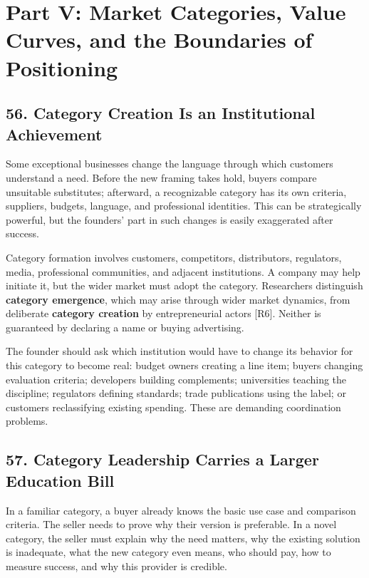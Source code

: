 \section*{Part V: Market Categories, Value Curves, and the Boundaries of Positioning}

\subsection*{56. Category Creation Is an Institutional Achievement}

Some exceptional businesses change the language through which customers understand a need. Before the new framing takes hold, buyers compare unsuitable substitutes; afterward, a recognizable category has its own criteria, suppliers, budgets, language, and professional identities. This can be strategically powerful, but the founders' part in such changes is easily exaggerated after success.

Category formation involves customers, competitors, distributors, regulators, media, professional communities, and adjacent institutions. A company may help initiate it, but the wider market must adopt the category. Researchers distinguish \textbf{category emergence}, which may arise through wider market dynamics, from deliberate \textbf{category creation} by entrepreneurial actors [R6]. Neither is guaranteed by declaring a name or buying advertising.

The founder should ask which institution would have to change its behavior for this category to become real: budget owners creating a line item; buyers changing evaluation criteria; developers building complements; universities teaching the discipline; regulators defining standards; trade publications using the label; or customers reclassifying existing spending. These are demanding coordination problems.

\subsection*{57. Category Leadership Carries a Larger Education Bill}

In a familiar category, a buyer already knows the basic use case and comparison criteria. The seller needs to prove why their version is preferable. In a novel category, the seller must explain why the need matters, why the existing solution is inadequate, what the new category even means, who should pay, how to measure success, and why this provider is credible.

